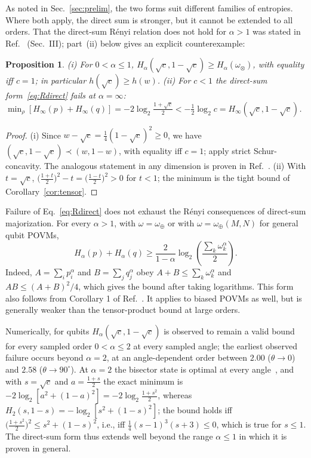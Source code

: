 \documentclass[aps,pra,twocolumn,superscriptaddress,nofootinbib,floatfix]{revtex4-2}
\newtheorem{proposition}{Proposition}
\theoremstyle{definition}
\newcommand{\maj}{\prec}
\newcommand{\omplus}{\omega_{\oplus}}
\newcommand{\omtimes}{\omega_{\otimes}}
\newcommand{\sqc}{\sqrt{c}}
\begin{document}
As noted in Sec.~\ref{sec:prelim}, the two forms suit different families of
entropies. Where both apply, the direct sum is stronger, but it cannot be
extended to all orders. That the direct-sum R\'enyi relation does not hold for
$\alpha>1$ was stated in Ref.~\cite{RPZ2014} (Sec.~III); part~(ii) below gives
an explicit counterexample:

\begin{proposition}
\label{prop:compare}
(i) For $0<\alpha\le1$, $H_\alpha(\sqc,1-\sqc)\ge H_\alpha(\omtimes)$, with
equality iff $c=1$; in particular $h(\sqc)\ge h(w)$.
(ii) For $c<1$ the direct-sum form~\eqref{eq:Rdirect} fails at $\alpha=\infty$:
$\min_\rho[H_\infty(p)+H_\infty(q)]=-2\log_2\frac{1+\sqc}{2}<-\frac12\log_2c=H_\infty(\sqc,1-\sqc)$.
\end{proposition}

\begin{proof}
(i) Since $w-\sqc=\frac14(1-\sqc)^2\ge0$, we have $(\sqc,1-\sqc)\maj(w,1-w)$,
with equality iff $c=1$; apply strict Schur-concavity. The analogous statement
in any dimension is proven in Ref.~\cite{RPZ2014}.
(ii) With $t=\sqc$, $\bigl(\frac{1+t}{2}\bigr)^2-t=\bigl(\frac{1-t}{2}\bigr)^2>0$
for $t<1$; the minimum is the tight bound of Corollary~\ref{cor:tensor}.
\end{proof}

Failure of Eq.~\eqref{eq:Rdirect} does not exhaust the R\'enyi consequences of
direct-sum majorization. For every $\alpha>1$, with $\omega=\omplus$ or with
$\omega=\omplus(M,N)$ for general qubit POVMs,
\begin{equation}
  H_\alpha(p)+H_\alpha(q)\ge
  \frac{2}{1-\alpha}\log_2\!\left(\frac{\sum_k\omega_k^\alpha}{2}\right).
  \label{eq:Rdirect-induced}
\end{equation}
Indeed, $A=\sum_ip_i^\alpha$ and $B=\sum_jq_j^\alpha$ obey $A+B\le\sum_k\omega_k^\alpha$
and $AB\le(A+B)^2/4$, which gives the bound after taking logarithms. This form
also follows from Corollary 1 of Ref.~\cite{Baek2019}. It applies to biased POVMs
as well, but is generally weaker than the tensor-product bound at large orders.

Numerically, for qubits $H_\alpha(\sqc,1-\sqc)$ is observed to remain a valid
bound for every sampled order $0<\alpha\le2$ at every sampled angle; the earliest
observed failure occurs beyond $\alpha=2$, at an angle-dependent order between
$2.00$ ($\theta\to0$) and $2.58$ ($\theta\to90^\circ$). At $\alpha=2$ the bisector state is optimal at
every angle~\cite{ZozorBosykPortesi2013}, and with $s=\sqc$ and
$a=\frac{1+s}{2}$ the exact minimum is
$-2\log_2[a^2+(1-a)^2]=-2\log_2\frac{1+s^2}{2}$, whereas
$H_2(s,1-s)=-\log_2[s^2+(1-s)^2]$; the bound holds iff
$\bigl(\frac{1+s^2}{2}\bigr)^2\le s^2+(1-s)^2$, i.e., iff
$\frac14(s-1)^3(s+3)\le0$, which is true for $s\le1$. The direct-sum form thus
extends well beyond the range $\alpha\le1$ in which it is proven in general.
\end{document}
